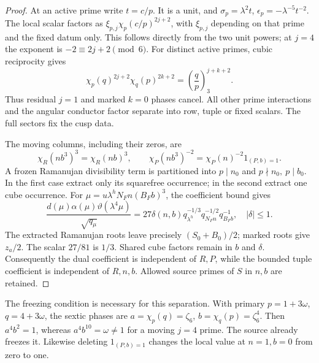 \begin{proof}
At an active prime write $t=c/p$. It is a unit, and
$\sigma_p=\lambda^2t$, $\epsilon_p=-\lambda^{-5}t^{-2}$.
The local scalar factors as
$\xi_{p,j}\chi_p(c/p)^{2j+2}$, with $\xi_{p,j}$ depending on that
prime and the fixed datum only. This follows directly from the two
unit powers; at $j=4$ the exponent is $-2\equiv2j+2\pmod6$.
For distinct active primes, cubic reciprocity gives
\[
 \chi_p(q)^{2j+2}\chi_q(p)^{2k+2}
       =\left(\frac qp\right)_3^{j+k+2}.
\]
Thus residual $j=1$ and marked $k=0$ phases cancel. All other prime
interactions and the angular conductor factor separate into row,
tuple or fixed scalars. The full sectors fix the cusp data.

The moving columns, including their zeros, are
\[
 \chi_R(nb^3)^3=\chi_R(nb)^3,\qquad
 \chi_P(nb^3)^{-2}=\chi_P(n)^{-2}1_{(P,b)=1}.
\]
A frozen Ramanujan divisibility term is partitioned into $p\mid n_0$
and $p\nmid n_0,\ p\mid b_0$. In the first case extract only its
squarefree occurrence; in the second extract one cube occurrence.
For $\mu=u\lambda^hN_Fn(B_Fb)^3$, the coefficient bound gives
\[
 \frac{d(\mu)\alpha(\mu)\vartheta(\lambda^4\mu)}{\sqrt{q_\mu}}
 =27\delta(n,b)q_{\lambda^h}^{-1/3}
                 q_{N_Fn}^{-1/2}q_{B_Fb}^{-1},\quad |\delta|\le1.
\]
The extracted Ramanujan roots leave precisely $(S_0+B_0)/2$;
marked roots give $z_a/2$. The scalar $27/81$ is $1/3$.
Shared cube factors remain in $b$ and $\delta$.
Consequently the dual coefficient is independent of $R,P$, while
the bounded tuple coefficient is independent of $R,n,b$.
Allowed source primes of $S$ in $n,b$ are retained.
\end{proof}

The freezing condition is necessary for this separation. With primary
$p=1+3\omega$, $q=4+3\omega$, the sextic phases are
$a=\chi_p(q)=\zeta_6$, $b=\chi_q(p)=\zeta_6^4$.
Then $a^4b^2=1$, whereas $a^4b^{10}=\omega\ne1$ for a moving $j=4$
prime. The source already freezes it. Likewise deleting $1_{(P,b)=1}$
changes the local value at $n=1,b=0$ from zero to one.


